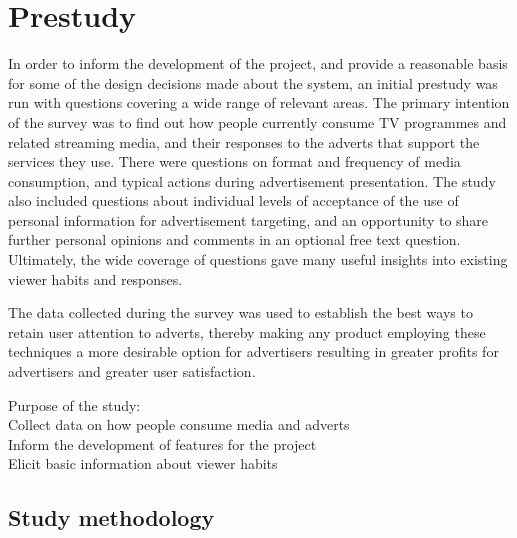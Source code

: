 \section{Prestudy}
\label{sec:prestudy}
In order to inform the development of the project, and provide a reasonable basis for some of the design decisions made about the system, an initial prestudy was run with questions covering a wide range of relevant areas. The primary intention of the survey was to find out how people currently consume TV programmes and related streaming media, and their responses to the adverts that support the services they use. There were questions on format and frequency of media consumption, and typical actions during advertisement presentation. The study also included questions about individual levels of acceptance of the use of personal information for advertisement targeting, and an opportunity to share further personal opinions and comments in an optional free text question. Ultimately, the wide coverage of questions gave many useful insights into existing viewer habits and responses.

The data collected during the survey was used to establish the best ways to retain user attention to adverts, thereby making any product employing these techniques a more desirable option for advertisers resulting in greater profits for advertisers and greater user satisfaction.




Purpose of the study:\\
Collect data on how people consume media and adverts\\
Inform the development of features for the project\\
Elicit basic information about viewer habits

\subsection{Study methodology}

